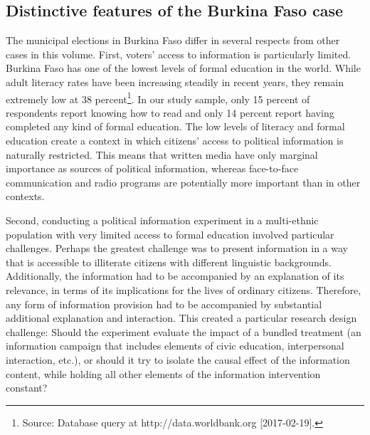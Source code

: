 \documentclass[11pt]{article}
\begin{document}
\subsection{Distinctive features of the Burkina Faso case}

The municipal elections in Burkina Faso differ in several respects from other cases in this volume. First, voters' access to information is particularly limited. Burkina Faso has one of the lowest levels of formal education in the world. While adult literacy rates have been increasing steadily in recent years, they remain extremely low at 38 percent\footnote{Source: Database query at http://data.worldbank.org [2017-02-19]. }. In our study sample, only 15 percent of respondents report knowing how to read and only 14 percent report having completed any kind of formal education. The low levels of literacy and formal education create a context in which citizens' access to political information is naturally restricted. This means that written media have only marginal importance as sources of political information, whereas face-to-face communication and radio programs are potentially more important than in other contexts. %

Second, conducting a political information experiment in a multi-ethnic population with very limited access to formal education involved particular challenges. Perhaps the greatest challenge was to present information in a way that is accessible to illiterate citizens with different linguistic backgrounds. Additionally, the information had to be accompanied by an explanation of its relevance, in terms of its implications for the lives of ordinary citizens. Therefore, any form of information provision had to be accompanied by substantial additional explanation and interaction. This created a particular research design challenge: Should the experiment evaluate the impact of a bundled treatment (an information campaign that includes elements of civic education, interpersonal interaction, etc.), or should it try to isolate the causal effect of the information content, while holding all other elements of the information intervention constant? 
\end{document}
